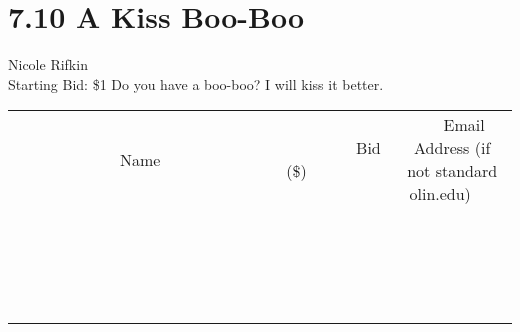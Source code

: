 \documentclass[11pt]{article}
\begin{document}
\section*{7.10 A Kiss Boo-Boo}
Nicole Rifkin
\\
Starting Bid: \$1
\newline
Do you have a boo-boo? I will kiss it better.
\\[3ex]
\begin{tabular}{c c c}
~~~~~~~~~~~~~Name~~~~~~~~~~~~~ & ~~~~~~~~~Bid (\$)~~~~~~~~~  & ~~~Email Address (if not standard olin.edu)~~~\\
 & & \\
\hline
 & & \\
\hline
 & & \\
\hline
 & & \\
\hline
 & & \\
\hline
 & & \\
\hline
 & & \\
\hline
 & & \\
\hline
 & & \\
\hline
 & & \\
\hline
 & & \\
\hline
 & & \\
\hline
 & & \\
\hline
 & & \\
\hline
 & & \\
\hline
 & & \\
\hline
 & & \\
\hline
 & & \\
\hline
 & & \\
\hline
\end{tabular}
\newpage
\end{document}
